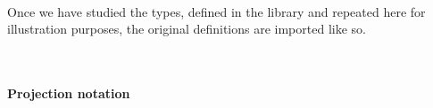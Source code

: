 \begin{code}
\>[1]\AgdaSpace{}%
\AgdaSymbol{:}\AgdaSpace{}%
\AgdaSymbol{(}\AgdaSpace{}%
\AgdaSymbol{:}\AgdaSpace{}%
\AgdaSpace{}%
\AgdaSpace{}%
\AgdaSymbol{)(}\AgdaSpace{}%
\AgdaSymbol{:}\AgdaSpace{}%
\AgdaSpace{}%
\AgdaSpace{}%
\AgdaSpace{}%
\AgdaSpace{}%
\AgdaSymbol{)}\AgdaSpace{}%
\AgdaSpace{}%
\AgdaSpace{}%
\AgdaSpace{}%
\AgdaSpace{}%
\<%
\\
%
\>[1]\AgdaSpace{}%
\AgdaSpace{}%
\AgdaSpace{}%
\AgdaSymbol{=}\AgdaSpace{}%
\AgdaSpace{}%
\<%
\\
%
\\[\AgdaEmptyExtraSkip]%
\>[1]\AgdaSpace{}%
\AgdaSpace{}%
\AgdaSpace{}%
\AgdaSpace{}%
\AgdaSpace{}%
\AgdaSpace{}%
\AgdaSymbol{)}\AgdaSpace{}%
\AgdaSymbol{=}\AgdaSpace{}%
\AgdaSpace{}%
\AgdaSpace{}%
\AgdaSpace{}%
\AgdaSpace{}%
\AgdaFunction{,}\AgdaSpace{}%
\<%
\end{code}
\ccpad
Once we have studied the types, defined in the \typetopology library and repeated here for illustration purposes, the original definitions are imported like so.
\ccpad
\begin{code}%
\>[0]\AgdaSpace{}%
\AgdaSpace{}%
\AgdaSpace{}%
\<%
\\
\>[0]\AgdaSpace{}%
\AgdaSpace{}%
\AgdaSpace{}%
\AgdaSpace{}%
\AgdaSymbol{(}\AgdaSymbol{;}\AgdaSpace{}%
\AgdaSymbol{;}\AgdaSpace{}%
\AgdaSymbol{;}\AgdaSpace{}%
\AgdaSymbol{;}\AgdaSpace{}%
\AgdaSymbol{;}\AgdaSpace{}%
\AgdaSymbol{)}\AgdaSpace{}
\<%
\end{code}

\paragraph*{Projection notation}

